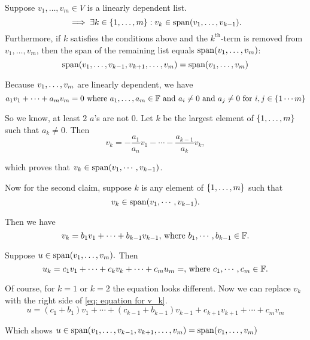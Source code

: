 
\setcounter{thm}{18}
\begin{thm} 
  \label{thm: linear dependence lemma}
  Suppose $v_{1}, \dots, v_{m}\in V$ is a linearly dependent list.
  \begin{equation}
    \implies \exists k \in \{ 1, \dots, m \} : v_k \in \operatorname{span} (v_1, \dots, v_{k-1}).
  \end{equation}
  Furthermore, if $k$ satisfies the conditions above and the $k^{\text{th}}$-term is removed from $v_1, \dots, v_m$, then the span of the remaining list equals $\operatorname{span} (v_1, \dots, v_{m})$:
  \begin{equation}
    \operatorname{span} (v_1, \dots, v_{k-1}, v_{k+1}, \dots, v_m) = \operatorname{span} (v_1, \dots, v_m)
  \end{equation}
\end{thm}
\begin{prf}
  Because $v_1, \dots, v_m$ are linearly dependent, we have 
  \begin{equation}
    a_1 v_1 + \cdots + a_m v_m = 0 
    $ where $a_1, \ldots, a_m \in \myF$ and $a_i \neq 0$ and $a_j \neq 0 $ for $i,j \in \{1 \cdots m\}
  \end{equation} 
  
  So we know, at least $2$ $a$'s are not $0$. 
  Let $k$ be the largest element of $\{ 1, \ldots, m \}$ such that $a_k \neq 0$. Then
  \begin{equation}
    v_k = - \frac{a_1}{a_n}v_1 - \cdots - \frac{a_{k-1}}{a_k}v_k,
  \end{equation}
  
  which proves that $v_k \in \operatorname{span} (v_1, \cdots, v_{k-1})$.
  
  Now for the second claim, suppose $k$ is any element of $\{ 1, \ldots, m \}$ such that 
  \begin{equation}
    v_k \in \operatorname{span} (v_1, \cdots, v_{k-1}).
  \end{equation}
  
  Then we have 
  \begin{equation}
    v_k = b_1v_1 + \cdots + b_{k-1}v_{k-1}, $ where $b_1, \cdots, b_{k-1} \in \myF.
    \label{eq: equation for v_k}
  \end{equation}
  
  Suppose $u \in \operatorname{span} (v_1, \ldots, v_m).$ Then
  \begin{equation}
  u_k = c_1v_1 + \cdots + c_kv_k + \cdots +c_{m}u_{m} = , $ where $c_1, \cdots, c_{m} \in \myF.
  \end{equation}
  
  Of course, for $k=1$ or $k=2$ the equation looks different. Now we can replace $v_k$ with the right side of \ref{eq: equation for v_k}.
  \begin{equation}
    u = (c_1+b_1)v_1 + \cdots + (c_{k-1} + b_{k-1})v_{k-1} + c_{k+1} v_{k+1} + \cdots + c_m v_m
  \end{equation}
  
  Which shows $u \in \operatorname{span} (v_1, \dots, v_{k-1}, v_{k+1}, \dots, v_m) = \operatorname{span} (v_1, \dots, v_m)$
\end{prf}
\setcounter{thm}{21}

